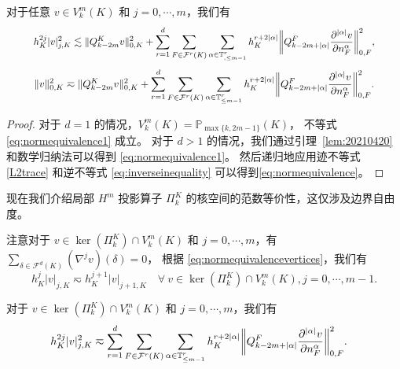 \begin{lemma}[虚单元空间的范数等价性]
对于任意 $v\in V_{k}^{m}(K)$ 和 $j=0,\cdots, m$，我们有
\begin{equation}\label{eq:normequivalence1}
\resizebox{0.9\textwidth}{!}{$\displaystyle
h_K^{2j}|v|_{j,K}^2\lesssim \|Q_{k-2m}^Kv\|_{0,K}^2
+ \sum_{r=1}^{d}\sum_{F\in\mathcal F^{r}(K)}\sum_{\alpha\in \mathbb{T}^{r}_{,
\leq m-1}}h_K^{r+2|\alpha|}\bigg\|Q_{k-2m+|\alpha|}^{F}\frac{\partial^{|\alpha|}v}{\partial \nnn_{F}^{\alpha}}\bigg\|_{0,F}^2,
$}
\end{equation}
\begin{equation}\label{eq:normequivalence}
\resizebox{0.9\textwidth}{!}{$\displaystyle
\|v\|_{0,K}^2\eqsim \|Q_{k-2m}^Kv\|_{0,K}^2
+ \sum_{r=1}^{d}\sum_{F\in\mathcal F^{r}(K)}\sum_{\alpha\in \mathbb{T}^{r}_{\leq
m-1}}h_K^{r+2|\alpha|}\bigg\|Q_{k-2m+|\alpha|}^{F}\frac{\partial^{|\alpha|}v}{\partial \nnn_{F}^{\alpha}}\bigg\|_{0,F}^2.
$}
\end{equation}
\end{lemma}
\begin{proof}
对于 $d=1$ 的情况，$V_{k}^{m}(K)=\mathbb P_{\max\{k, 2m-1\}}(K)$，
不等式 \eqref{eq:normequivalence1} 成立。
对于 $d > 1$ 的情况，我们通过引理~\ref{lem:20210420} 
和数学归纳法可以得到 \eqref{eq:normequivalence1}。
然后递归地应用迹不等式 \eqref{L2trace}
和逆不等式 \eqref{eq:inverseinequality} 可以得到\eqref{eq:normequivalence}。 
\end{proof}

现在我们介绍局部 $H^m$ 投影算子 $\Pi_k^K$ 的核空间的范数等价性，这仅涉及边界自由度。

注意对于 $v\in \ker(\Pi_k^K)\cap V_{k}^{m}(K)$ 和 $j=0,\cdots, m$，有 $\sum\limits_{\delta\in\mathcal F^{d}(K)}(\nabla^{j}v)(\delta)=0$，
根据 \eqref{eq:normequivalencevertices}，我们有
\begin{equation}\label{eq:normequivalence-kerpi0}
h_K^{j}|v|_{j,K}\eqsim h_K^{j+1}|v|_{j+1,K} \quad\forall~v\in\ker(\Pi_k^K)\cap V_{k}^{m}(K), j=0,\cdots, m-1.
\end{equation}

\begin{lemma}
对于 $v\in \ker(\Pi_k^K)\cap V_{k}^{m}(K)$ 和 $j=0,\cdots, m$，我们有
\begin{align}
h_K^{2j}|v|_{j,K}^2&\eqsim \sum_{r=1}^{d}\sum_{F\in\mathcal
F^{r}(K)}\sum_{\alpha\in \mathbb{T}^{r}_{\leq m-1}}h_K^{r+2|\alpha|}\bigg\|Q_{k-2m+|\alpha|}^{F}\frac{\partial^{|\alpha|}v}{\partial n_{F}^{\alpha}}\bigg\|_{0,F}^2. \label{eq:normequivalence-kerpi1}
\end{align}
\end{lemma}

